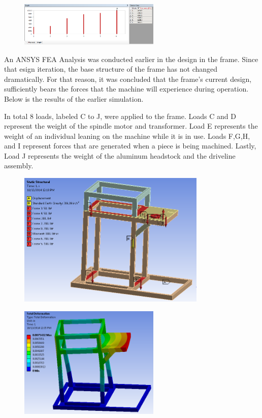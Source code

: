 \begin{figure}[H]
    \centering
    \includegraphics[width=0.6\textwidth]{./images/Chapter3-Calculations/AnsysMotorMount2}
    \label{fig:MM2}
\end{figure}

\newpage

An ANSYS FEA Analysis was conducted earlier in the design in the frame. Since that esign iteration, the base structure of the frame has not changed dramatically. For that reason, it was concluded that the frame's current design, sufficiently bears the forces that the machine will experience during operation. Below is the results of the earlier simulation.

In total 8 loads, labeled C to J, were applied to the frame. Loads C and D represent the weight of the spindle motor and transformer. Load E represents the weight of an individual leaning on the machine while it is in use.  Loads F,G,H, and I represent forces that are generated when a piece is being machined. Lastly, Load J represents the weight of the aluminum headstock and the driveline assembly. 

\begin{figure}[H]
    \centering
    \includegraphics[width=0.8\textwidth]{./images/Chapter3-Calculations/lp1}
    \label{fig:MM2}
\end{figure}

\begin{figure}[H]
    \centering
    \includegraphics[width=0.6\textwidth]{./images/Chapter3-Calculations/mp1}
    \label{fig:MM2}
\end{figure}

